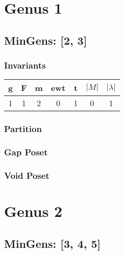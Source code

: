 \documentclass[a4paper]{article}
\begin{document}
\tableofcontents
\newpage
\section{Genus 1}
\newpage\subsection{MinGens: [2, 3]}
\subsubsection*{Invariants}
\begin{minipage}{0.48\textwidth}
\begin{tabular}{|c|c|c|c|c|c|c|}
\toprule
g & F & m & ewt & t & \(|M|\) & \(|\lambda|\) \\
\midrule
1 & 1 & 2 & 0 & 1 & 0 & 1 \\
\bottomrule
\end{tabular}
\end{minipage}
\subsubsection*{Partition}
\begin{minipage}{0.48\textwidth}
\end{minipage}
\subsubsection*{Gap Poset}
\begin{minipage}{0.48\textwidth}
\end{minipage}
\subsubsection*{Void Poset}
\begin{minipage}{0.48\textwidth}
\end{minipage}
\section{Genus 2}
\newpage\subsection{MinGens: [3, 4, 5]}
\end{document}
